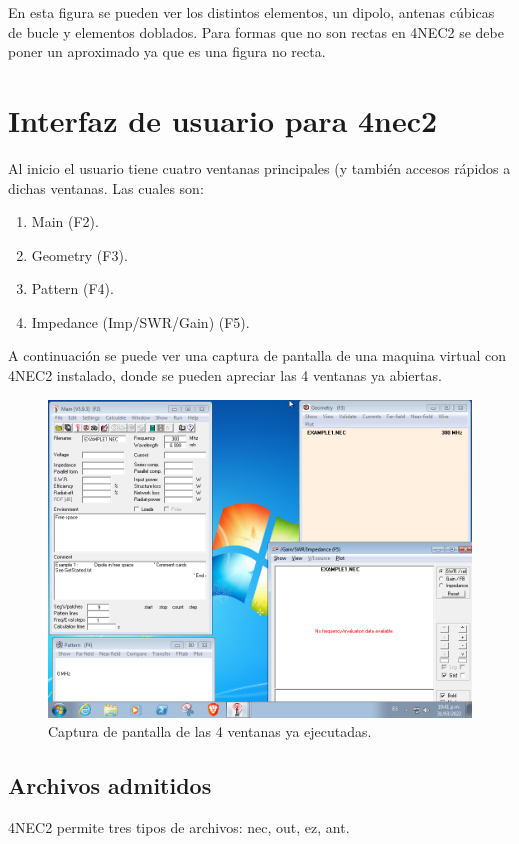 \documentclass[12pt]{article}
\begin{document}
En esta figura se pueden ver los distintos elementos, un dipolo, antenas
cúbicas de bucle y elementos doblados. Para formas que no son rectas en 4NEC2 se
debe poner un aproximado ya que es una figura no recta.

\section{Interfaz de usuario para 4nec2}

Al inicio el usuario tiene cuatro ventanas principales (y también accesos
r\'apidos a dichas ventanas. Las cuales son:

\begin{enumerate}
    \item Main (F2).
    \item Geometry (F3).
    \item Pattern (F4).
    \item Impedance (Imp/SWR/Gain) (F5).
\end{enumerate}

A continuación se puede ver una captura de pantalla de una maquina virtual con
4NEC2 instalado, donde se pueden apreciar las 4 ventanas ya abiertas.

\begin{figure}[H]
    \centering
    \includegraphics[width=.8\linewidth]{images/Screenshot_win7_2022-03-31_22_41_34.png}
    \caption{Captura de pantalla de las 4 ventanas ya ejecutadas.}
\end{figure}

\subsection{Archivos admitidos}

4NEC2 permite tres tipos de archivos: nec, out, ez, ant.
\end{document}
